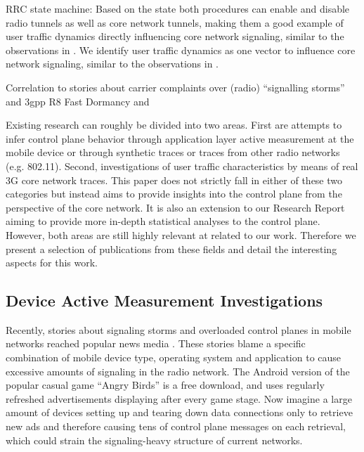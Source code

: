 \gls{RRC} state machine:
Based on the state both procedures can enable and disable radio tunnels as well as core network tunnels, making them a good example of user traffic dynamics directly influencing core network signaling, similar to the observations in \cite{lee2007detection}. We identify user traffic dynamics as one vector to influence core network signaling, similar to the observations in \cite{lee2007detection}.


Correlation to stories about carrier complaints over (radio) ``signalling storms''  and 3gpp R8 Fast Dormancy \cite{3gpp.25.331} and \cite{gsma2011fdbestpract}


Existing research can roughly be divided into two areas. First are attempts to infer control plane behavior through application layer active measurement at the mobile device or through synthetic traces or traces from other radio networks (e.g. 802.11).
Second, investigations of user traffic characteristics by means of real 3G core network traces.
This paper does not strictly fall in either of these two categories but instead aims to provide insights into the control plane from the perspective of the core network. It is also an extension to our Research Report\cite{metzger2012research} aiming to provide more in-depth statistical analyses to the control plane.  
However, both areas are still highly relevant at related to our work. Therefore we present a selection of publications from these fields and detail the interesting aspects for this work.



\subsection{Device Active Measurement Investigations}

Recently, stories about signaling storms and overloaded control planes in mobile networks reached popular news media \cite{it2011birdandroid, lt2012docostorm}. These stories blame a specific combination of mobile device type, operating system and application to cause excessive amounts of signaling in the radio network. The Android version of the popular casual game ``Angry Birds'' is a free download, and uses regularly refreshed advertisements displaying after every game stage. Now imagine a large amount of devices setting up and tearing down data connections only to retrieve new ads and therefore causing tens of control plane messages on each retrieval, which could strain the signaling-heavy structure of current networks. 

